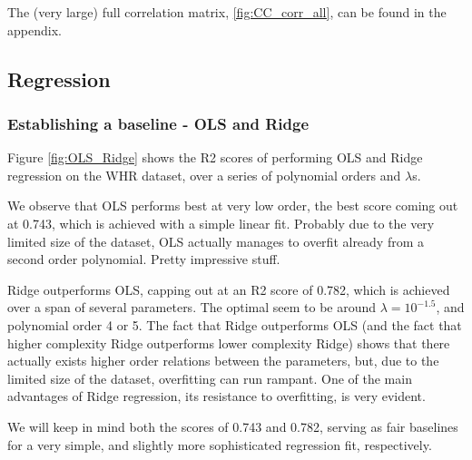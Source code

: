 \documentclass[10pt, twocolumn]{article}
\begin{document}
The (very large) full correlation matrix, \cref{fig:CC_corr_all}, can be found in the appendix. 






\subsection{Regression}
\subsubsection{Establishing a baseline - OLS and Ridge}
Figure \ref{fig:OLS_Ridge} shows the R2 scores of performing OLS and Ridge regression on the WHR dataset, over a series of polynomial orders and $\lambda$s.

We observe that OLS performs best at very low order, the best score coming out at 0.743, which is achieved with a simple linear fit. Probably due to the very limited size of the dataset, OLS actually manages to overfit already from a second order polynomial. Pretty impressive stuff.

Ridge outperforms OLS, capping out at an R2 score of 0.782, which is achieved over a span of several parameters. The optimal seem to be around $\lambda = 10^{-1.5}$, and polynomial order 4 or 5. The fact that Ridge outperforms OLS (and the fact that higher complexity Ridge outperforms lower complexity Ridge) shows that there actually exists higher order relations between the parameters, but, due to the limited size of the dataset, overfitting can run rampant. One of the main advantages of Ridge regression, its resistance to overfitting, is very evident.

We will keep in mind both the scores of 0.743 and 0.782, serving as fair baselines for a very simple, and slightly more sophisticated regression fit, respectively.
\end{document}
